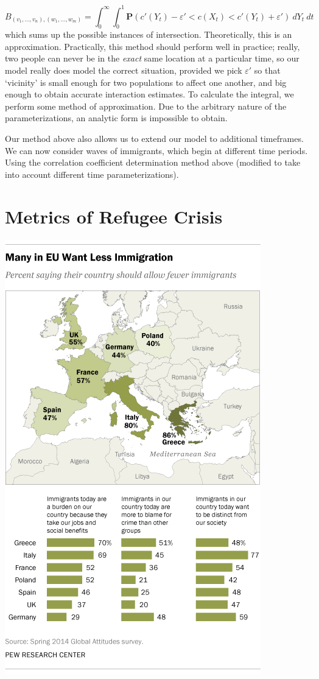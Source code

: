 \documentclass{article}
\begin{document}
%
\[ B_{(v_1, \dots, v_n), (w_1, \dots, w_m)} = \int_0^\infty \int_0^1 \mathbf{P}\left(c'(Y_t) - \varepsilon' < c(X_t) < c'(Y_t) + \varepsilon'\right)\ dY_t\ dt \]
%
which sums up the possible instances of intersection. Theoretically, this is an approximation. Practically, this method should perform well in practice; really, two people can never be in the {\it exact} same location at a particular time, so our model really does model the correct situation, provided we pick $\varepsilon'$ so that `vicinity' is small enough for two populations to affect one another, and big enough to obtain accurate interaction estimates. To calculate the integral, we perform some method of approximation. Due to the arbitrary nature of the parameterizations, an analytic form is impossible to obtain.

Our method above also allows us to extend our model to additional timeframes. We can now consider waves of immigrants, which begin at different time periods. Using the correlation coefficient determination method above (modified to take into account different time parameterizations).

\section{Metrics of Refugee Crisis}

\begin{center}
\includegraphics[scale=0.5]{ImmigrationPoll}
\end{center}



\end{document}
